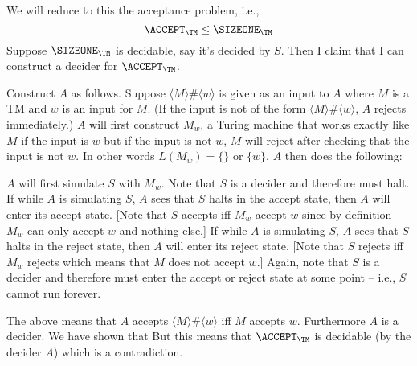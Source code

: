 We will reduce to this the acceptance problem, i.e.,
\[
\ACCEPT_\TM \leq \SIZEONE_\TM
\]
Suppose $\SIZEONE_\TM$ is decidable, say it's decided by $S$.
Then I claim that I can construct a decider for $\ACCEPT_\TM$.

Construct $A$ as follows.
Suppose $\langle M \rangle \# \langle w \rangle$ is given
as an input to $A$ where
$M$ is a TM and $w$ is an input for $M$.
(If the input is not of the form $\langle M \rangle \# \langle w \rangle$,
$A$ rejects immediately.)
$A$ will first construct $M_w$, a Turing machine
that works exactly like $M$ if the input is $w$
but if the input is not $w$, $M$ will reject after checking that the
input is not $w$.
In other words $L(M_w) = \{\}$ or $\{w\}$.
$A$ then does the following:
\begin{tightlist}
  \li $A$ will first simulate
  $S$ with $M_w$.
  Note that $S$ is a decider and therefore must halt.
  \li If while $A$ is simulating
  $S$, $A$ sees that $S$ halts in the accept state, then
  $A$ will enter its accept state.
  [Note that $S$ accepts iff $M_w$
  accept $w$ since by definition $M_w$ can only accept $w$
  and nothing else.]
  \li
  If while $A$ is simulating $S$, $A$ sees that $S$
  halts in the reject state, then $A$ will enter its reject state.
  [Note that $S$ rejects iff $M_w$ rejects
  which means that $M$ does not accept $w$.]
  \li Again, note that $S$ is a decider and therefore must enter
  the accept or reject state at some point -- i.e., $S$
  cannot run forever.
\end{tightlist}
The above means that $A$ accepts $\langle M \rangle \# \langle w \rangle$
iff $M$ accepts $w$. Furthermore $A$ is a decider.
We have shown that
But this means that $\ACCEPT_\TM$ is decidable (by the decider $A$)
which is a contradiction.
